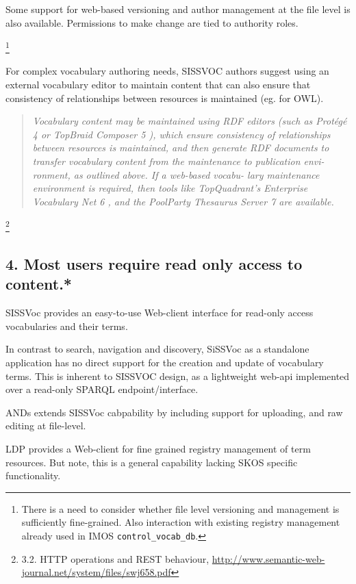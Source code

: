 \documentclass[10pt,a4paper]{article}
\newenvironment{italicquotes}
{\begin{quote}\itshape}
{\end{quote}}
\begin{document}
\begin{flushleft}
  Some support for web-based versioning and author management at the file level
is also available. Permissions to make change are tied to authority roles.

  \footnote {
    There is a need to consider whether file level versioning and management is
  sufficiently fine-grained. Also interaction with existing registry management
  already used in IMOS \texttt{control\_vocab\_db}. 
  }
  
  For complex vocabulary authoring needs, SISSVOC authors suggest using an
external vocabulary editor to maintain content that can also ensure that consistency of
relationships between resources is maintained (eg. for OWL). 

  \begin{italicquotes} 
  Vocabulary content may be maintained using RDF editors (such as Protégé 4 or
TopBraid Composer 5 ), which ensure consistency of
relationships between resources is maintained, and
then generate RDF documents to transfer vocabulary
content from the maintenance to publication envi-
ronment, as outlined above. If a web-based vocabu-
lary maintenance environment is required, then tools
like TopQuadrant’s Enterprise Vocabulary Net 6 , and
the PoolParty Thesaurus Server 7 are available.
  \end{italicquotes} 

  \footnote {
    3.2. HTTP operations and REST behaviour, 
\url{http://www.semantic-web-journal.net/system/files/swj658.pdf} 
  }


\subsection{ 
  4. Most users require read only access to content.* 
}
  SISSVoc provides an easy-to-use Web-client interface for read-only access vocabularies and their terms.

  In contrast to search, navigation and discovery, SiSSVoc as a standalone application has no direct 
  support for the creation and update of vocabulary terms. This is inherent to SISSVOC design, as a 
  lightweight web-api implemented over a read-only SPARQL endpoint/interface.  

  ANDs extends SISSVoc cabpability by including support for uploading, and raw editing
  at file-level. 

  LDP provides a Web-client for fine grained registry management of term
resources. But note, this is a general capability lacking SKOS specific functionality.



\end{flushleft}
\end{document}
